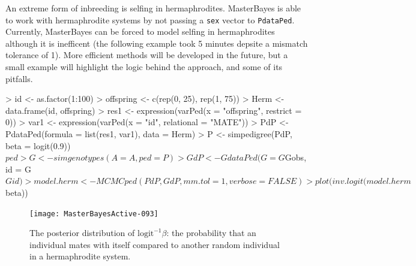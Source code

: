 \documentclass{article}
\begin{document}
An extreme form of inbreeding is selfing in hermaphrodites.  MasterBayes is able to work with hermaphrodite systems by not passing a \texttt{sex} vector to \texttt{PdataPed}.  Currently, MasterBayes can be forced to model selfing in hermaphrodites although it is inefficent (the following example took 5 minutes depsite a mismatch tolerance of 1).  More efficient methods will be developed in the future, but a small example will highlight the logic behind the approach, and some of its pitfalls.

\begin{Schunk}
\begin{Sinput}
> id <- as.factor(1:100)
> offspring <- c(rep(0, 25), rep(1, 75))
> Herm <- data.frame(id, offspring)
> res1 <- expression(varPed(x = "offspring", restrict = 0))
> var1 <- expression(varPed(x = "id", relational = "MATE"))
> PdP <- PdataPed(formula = list(res1, var1), data = Herm)
> P <- simpedigree(PdP, beta = logit(0.9))$ped
> G <- simgenotypes(A = A, ped = P)
> GdP <- GdataPed(G = G$Gobs, id = G$Gid)
> model.herm <- MCMCped(PdP, GdP, mm.tol = 1, verbose = FALSE)
> plot(inv.logit(model.herm$beta))
\end{Sinput}
\end{Schunk}


\begin{figure}[!h]
\begin{center}
\texttt{[image: MasterBayesActive-093]}
\end{center}
\caption{The posterior distribution of $\textrm{logit}^{-1}\beta$: the probability that an individual mates with itself compared to another random individual in a hermaphrodite system.}
\label{Herm-fig}
\end{figure}
\end{document}
